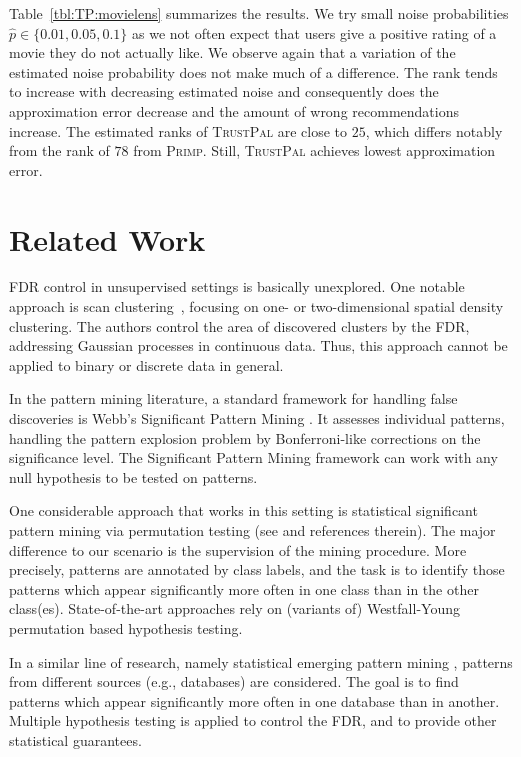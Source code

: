 Table~\ref{tbl:TP:movielens} summarizes the results. We try small noise probabilities $\hat{p}\in\{0.01,0.05,0.1\}$ as we not often expect that users give a positive rating of a movie they do not actually like. We observe again that a variation of the estimated noise probability does not make much of a difference. The rank tends to increase with decreasing estimated noise and consequently does the approximation error decrease and the amount of wrong recommendations increase. The estimated ranks of \textsc{TrustPal} are close to $25$, which differs notably from the rank of $78$ from \textsc{Primp}. Still, \textsc{TrustPal} achieves lowest approximation error.
\section{Related Work}\label{sec:TP:relatedWork}
FDR control in unsupervised settings is basically unexplored. One notable approach is scan clustering~\cite{pacifico2007scan}, focusing on one- or two-dimensional spatial density clustering. The authors control the area of discovered clusters by the FDR, addressing Gaussian processes in continuous data. Thus, this approach cannot be applied to binary or discrete data in general.  

In the pattern mining literature, a standard framework for handling false discoveries is Webb's Significant Pattern Mining \cite{webb2007discovering}.  It assesses individual patterns, handling the pattern explosion problem by Bonferroni-like corrections on the significance level. The Significant Pattern Mining framework can work with any null hypothesis to be tested on patterns.  

One considerable approach that works in this setting is statistical significant pattern mining via permutation testing (see \cite{llinares2015fast} and references therein). The major difference to our scenario is the supervision of the mining procedure. More precisely, patterns are annotated by class labels, and the task is to identify those patterns which appear significantly more often in one class than in the other class(es). State-of-the-art approaches rely on (variants of) Westfall-Young permutation based hypothesis testing. 

In a similar line of research, namely statistical emerging pattern mining \cite{komiyama2017statistical}, patterns from different sources (e.g., databases) are considered. The goal is to find patterns which appear significantly more often in one database than in another. Multiple hypothesis testing is applied to control the FDR, and to provide other statistical guarantees. 

